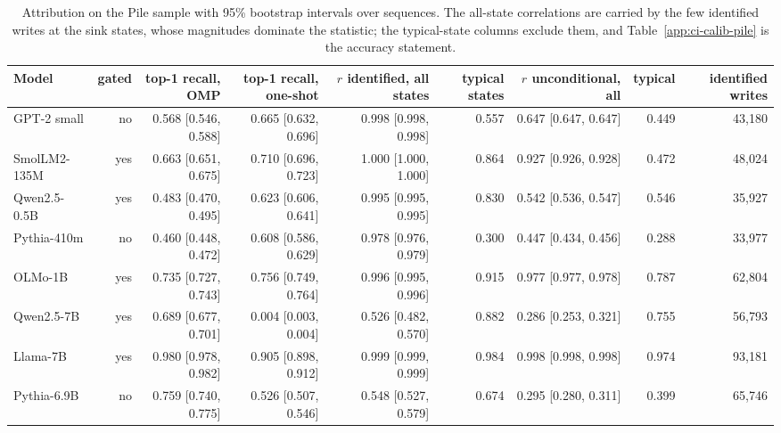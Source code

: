\begin{table}[H]\centering\scriptsize
\caption{Attribution on the Pile sample with 95\% bootstrap intervals over sequences. The all-state correlations are carried by the few identified writes at the sink states, whose magnitudes dominate the statistic; the typical-state columns exclude them, and Table~\ref{app:ci-calib-pile} is the accuracy statement.}\label{app:ci-attrib-pile}
\begin{adjustbox}{max width=\linewidth}
\begin{tabular}{lrrrrrrrr}\toprule
Model & gated & top-1 recall, OMP & top-1 recall, one-shot & $r$ identified, all states & typical states & $r$ unconditional, all & typical & identified writes \\ \midrule
GPT-2 small & no & 0.568 [0.546, 0.588] & 0.665 [0.632, 0.696] & 0.998 [0.998, 0.998] & 0.557 & 0.647 [0.647, 0.647] & 0.449 & 43,180 \\
SmolLM2-135M & yes & 0.663 [0.651, 0.675] & 0.710 [0.696, 0.723] & 1.000 [1.000, 1.000] & 0.864 & 0.927 [0.926, 0.928] & 0.472 & 48,024 \\
Qwen2.5-0.5B & yes & 0.483 [0.470, 0.495] & 0.623 [0.606, 0.641] & 0.995 [0.995, 0.995] & 0.830 & 0.542 [0.536, 0.547] & 0.546 & 35,927 \\
Pythia-410m & no & 0.460 [0.448, 0.472] & 0.608 [0.586, 0.629] & 0.978 [0.976, 0.979] & 0.300 & 0.447 [0.434, 0.456] & 0.288 & 33,977 \\
OLMo-1B & yes & 0.735 [0.727, 0.743] & 0.756 [0.749, 0.764] & 0.996 [0.995, 0.996] & 0.915 & 0.977 [0.977, 0.978] & 0.787 & 62,804 \\
Qwen2.5-7B & yes & 0.689 [0.677, 0.701] & 0.004 [0.003, 0.004] & 0.526 [0.482, 0.570] & 0.882 & 0.286 [0.253, 0.321] & 0.755 & 56,793 \\
Llama-7B & yes & 0.980 [0.978, 0.982] & 0.905 [0.898, 0.912] & 0.999 [0.999, 0.999] & 0.984 & 0.998 [0.998, 0.998] & 0.974 & 93,181 \\
Pythia-6.9B & no & 0.759 [0.740, 0.775] & 0.526 [0.507, 0.546] & 0.548 [0.527, 0.579] & 0.674 & 0.295 [0.280, 0.311] & 0.399 & 65,746 \\
\bottomrule\end{tabular}\end{adjustbox}
\end{table}
